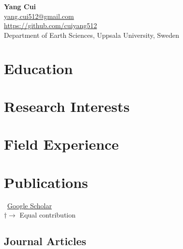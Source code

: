 \documentclass[11pt]{article} %
\newcommand{\mytitle}[4]{
  \begin{center}
    \Large\textbf{#1}\normalsize \\ %
    \href{mailto:#2}{#2} \\ %
    \href{https://#3}{#3} \\ %
    #4 %
  \end{center}
}
\begin{document}
\mytitle{Yang Cui}{yang.cui512@gmail.com}{https://github.com/cuiyang512}{Department of Earth Sciences, Uppsala University, Sweden} %


\RaggedRight


\section*{Education}


\section*{Research Interests}
\label{research_interests}


% 

\section*{Field Experience}
\label{field_exp}




\section*{Publications}
\label{pubs}

\vspace{-.75em}
\small
\faGoogle~\href{https://scholar.google.com/citations?user=jCXHSzAAAAAJ&hl=en}{Google Scholar}\\
$\dagger \rightarrow$ Equal contribution
\normalsize


\subsection*{Journal Articles}
\label{journal-article}
\newrefcontext[] %
\nocite{*} %
\end{document}
